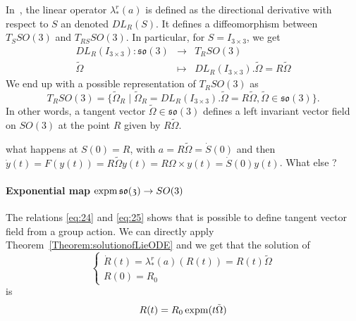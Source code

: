 In~\cite{Bruls.Cardona2010}, the linear operator $\lambda^r_{*}(a)$  is defined as  the directional derivative with respect to $S$ an denoted $DL_R(S)$. It defines a diffeomorphism between $T_SSO(3)$ and $T_{RS}SO(3)$. In particular, for $S=I_{3\times3}$, we get
\begin{equation}
  \label{eq:62}
  \begin{array}{rcl}
    DL_R(I_{3\times3}) : \mathfrak{so}(3) & \rightarrow & T_R SO(3) \\
    \tilde \Omega &\mapsto &DL_R(I_{3\times3}). \tilde \Omega = R \tilde \Omega
  \end{array}
\end{equation}
We end up with a possible representation of $T_{R} SO(3)$ as
\begin{equation}
  \label{eq:63}
  T_{R} SO(3) =\{\tilde \Omega_R \mid \tilde \Omega_R = DL_R(I_{3\times3}). \tilde \Omega = R \tilde \Omega, \tilde \Omega \in\mathfrak{so}(3)  \}.
\end{equation}
In other words, a tangent vector $\tilde \Omega \in \mathfrak{so}(3)$ defines a left invariant vector field on $SO(3)$ at the point $R$ given by $R \tilde \Omega$.




\begin{ndrva}
  what happens at $S(0)=R$, with $ a =R \tilde \Omega =\dot S(0)$ and then $\dot y(t) = F(y(t)) = R \tilde \Omega y(t) =  R\Omega \times y(t)= \dot S(0) y(t) $. What else ?
\end{ndrva}


\paragraph{Exponential map $\operatorname{expm} \mathfrak{so(3)} \rightarrow SO(3)$}
The relations \eqref{eq:24} and \eqref{eq:25} shows that is possible to define tangent vector field from a group action. We can directly apply Theorem~\ref{Theorem:solutionofLieODE} and we get that the solution of
\begin{equation}
  \label{eq:130}
  \begin{cases}
  \dot R(t) = \lambda^r_{*}(a)(R(t)) = R(t)  \tilde \Omega \\
  R(0) = R_0
\end{cases}
\end{equation}
 is
\begin{equation}
  \label{eq:138}
  R(t) = R_0 \operatorname{expm}(t \tilde \Omega)
\end{equation}

